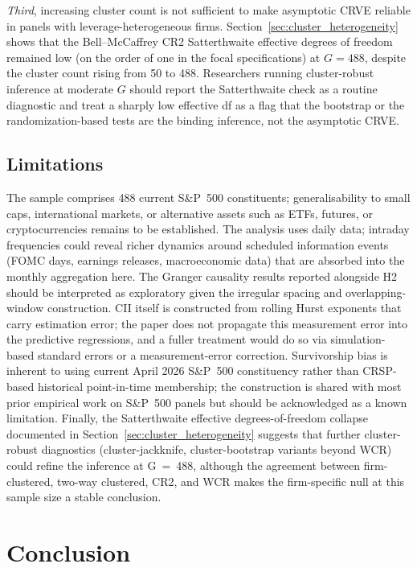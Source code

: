 \documentclass[preprint,12pt,authoryear]{elsarticle}
\begin{document}
\emph{Third}, increasing cluster count is not sufficient to make asymptotic CRVE reliable in panels with leverage-heterogeneous firms. Section~\ref{sec:cluster_heterogeneity} shows that the Bell--McCaffrey CR2 Satterthwaite effective degrees of freedom remained low (on the order of one in the focal specifications) at $G = 488$, despite the cluster count rising from 50 to 488. Researchers running cluster-robust inference at moderate $G$ should report the Satterthwaite check as a routine diagnostic and treat a sharply low effective df as a flag that the bootstrap or the randomization-based tests are the binding inference, not the asymptotic CRVE.

\subsection{Limitations}

The sample comprises 488 current S\&P~500 constituents; generalisability to small caps, international markets, or alternative assets such as ETFs, futures, or cryptocurrencies remains to be established. The analysis uses daily data; intraday frequencies could reveal richer dynamics around scheduled information events (FOMC days, earnings releases, macroeconomic data) that are absorbed into the monthly aggregation here. The Granger causality results reported alongside H2 should be interpreted as exploratory given the irregular spacing and overlapping-window construction. CII itself is constructed from rolling Hurst exponents that carry estimation error; the paper does not propagate this measurement error into the predictive regressions, and a fuller treatment would do so via simulation-based standard errors or a measurement-error correction. Survivorship bias is inherent to using current April 2026 S\&P~500 constituency rather than CRSP-based historical point-in-time membership; the construction is shared with most prior empirical work on S\&P~500 panels but should be acknowledged as a known limitation. Finally, the Satterthwaite effective degrees-of-freedom collapse documented in Section~\ref{sec:cluster_heterogeneity} suggests that further cluster-robust diagnostics (cluster-jackknife, cluster-bootstrap variants beyond WCR) could refine the inference at G~=~488, although the agreement between firm-clustered, two-way clustered, CR2, and WCR makes the firm-specific null at this sample size a stable conclusion.

\section{Conclusion}
\label{sec:conclusion}
\end{document}
